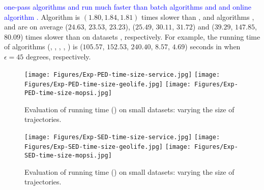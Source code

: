 { \textcolor{blue}{one-pass algorithms \intersec and \interval run much faster than batch algorithms \tpa and \dpa and online algorithm \opwa.}
%
%
Algorithm \interval is $(1.80, 1.84, 1.81)$ times slower than \intersec, and algorithms \tpa, \dpa and \opwa are on average
($24.63$, $23.53$, $23.23$), ($25.49$, $30.11$, $31.72$) and ($39.29$, $147.85$, $80.09$)
times slower than \intersec on datasets \dSets, respectively.
%
For example, the running time of algorithms
(\tpa, \dpa, \opwa, \interval, \intersec) is ($105.57$, $152.53$, $240.40$, $8.57$, $4.69$) seconds in \mopsi when
$\epsilon=45$ degrees, respectively.



\begin{figure*}[tb!]
	\centering
	\texttt{[image: Figures/Exp-PED-time-size-service.jpg]}	\hspace{0.5ex}
	\texttt{[image: Figures/Exp-PED-time-size-geolife.jpg]}	\hspace{0.5ex}
	\texttt{[image: Figures/Exp-PED-time-size-mopsi.jpg]}	
	\vspace{-2ex}
	\caption{\small Evaluation of running time (\ped) on small datasets: varying the size of trajectories.}\label{fig:time-size-ped}
	\vspace{-2ex}
\end{figure*}

\begin{figure*}[tb!]
	\centering
	\texttt{[image: Figures/Exp-SED-time-size-service.jpg]}	\hspace{0.5ex}
	\texttt{[image: Figures/Exp-SED-time-size-geolife.jpg]}	\hspace{0.5ex}
	\texttt{[image: Figures/Exp-SED-time-size-mopsi.jpg]}	
	\vspace{-2ex}
	\caption{\small Evaluation of running time (\sed) on small datasets: varying the size of trajectories.}\label{fig:time-size-sed}
	\vspace{-2ex}
\end{figure*}

}
